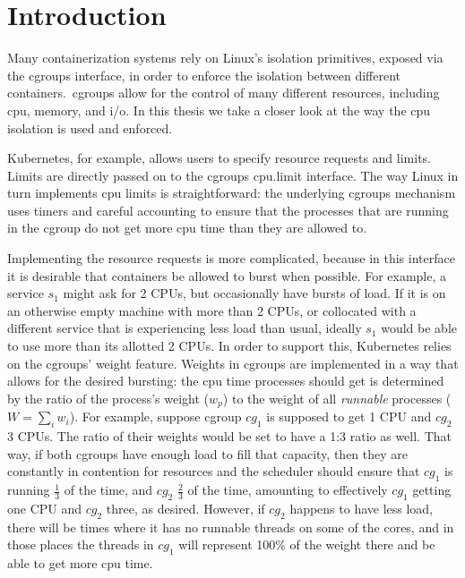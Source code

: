 
\section{Introduction}
\label{sec:introduction}

Many containerization systems rely on Linux's isolation primitives, exposed via
the cgroups interface, in order to enforce the isolation between different
containers.\ cgroups allow for the control of many different resources,
including cpu, memory, and i/o. In this thesis we take a closer look at the way
the cpu isolation is used and enforced. 

Kubernetes\cite{kubernetes}, for example, allows users to specify resource
requests and limits. Limits are directly passed on to the cgroups cpu.limit
interface. The way Linux in turn implements cpu limits is straightforward: the
underlying cgroups mechanism uses timers and careful accounting to ensure that
the processes that are running in the cgroup do not get more cpu time than they
are allowed to. 

Implementing the resource requests is more complicated, because in this
interface it is desirable that containers be allowed to burst when possible. For
example, a service $s_1$ might ask for 2 CPUs, but occasionally have bursts of
load. If it is on an otherwise empty machine with more than 2 CPUs, or
collocated with a different service that is experiencing less load than usual,
ideally $s_1$ would be able to use more than its allotted 2 CPUs. In order to
support this, Kubernetes relies on the cgroups' weight feature. Weights in
cgroups are implemented in a way that allows for the desired bursting: the cpu
time processes should get is determined by the ratio of the process's weight
($w_p$) to the weight of all \textit{runnable} processes ($W = \sum_i w_i$). For
example, suppose cgroup $cg_1$ is supposed to get 1 CPU and $cg_2$ 3 CPUs. The
ratio of their weights would be set to have a 1:3 ratio as well. That way, if
both cgroups have enough load to fill that capacity, then they are constantly in
contention for resources and the scheduler should ensure that $cg_1$ is running
$\frac{1}{3}$ of the time, and $cg_2$ $\frac{2}{3}$ of the time, amounting to
effectively $cg_1$ getting one CPU and $cg_2$ three, as desired. However, if
$cg_2$ happens to have less load, there will be times where it has no runnable
threads on some of the cores, and in those places the threads in $cg_1$ will
represent 100\% of the weight there and be able to get more cpu time.


